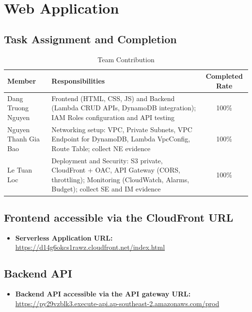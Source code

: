 \chapter{Web Application}

\section{Task Assignment and Completion}

\begin{table}[h]
\centering
\begin{tabular}{|l|p{9cm}|c|}
\hline
\textbf{Member} & \textbf{Responsibilities} & \textbf{Completed Rate} \\ \hline

Dang Truong Nguyen
& Frontend (HTML, CSS, JS) and Backend (Lambda CRUD APIs, DynamoDB integration); IAM Roles configuration and API testing 
& 100\% \\ \hline

Nguyen Thanh Gia Bao 
& Networking setup: VPC, Private Subnets, VPC Endpoint for DynamoDB, Lambda VpcConfig, Route Table; collect NE evidence 
& 100\% \\ \hline

Le Tuan Loc
& Deployment and Security: S3 private, CloudFront + OAC, API Gateway (CORS, throttling); Monitoring (CloudWatch, Alarms, Budget); collect SE and IM evidence 
& 100\% \\ \hline

\end{tabular}
\caption{Team Contribution}
\end{table}

\section{Frontend accessible via the CloudFront URL}
\begin{itemize}
    \item \textbf{Serverless Application URL:} \url{https://d14g6okcs1rawz.cloudfront.net/index.html}
\end{itemize}

\section{Backend API}
\begin{itemize}
    \item \textbf{Backend API accessible via the API gateway URL:} \url{https://py29vzblk3.execute-api.ap-southeast-2.amazonaws.com/prod}
\end{itemize}

